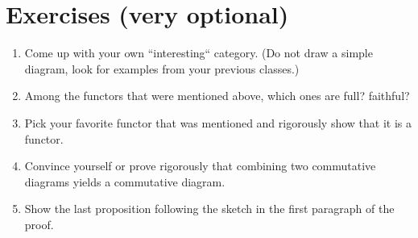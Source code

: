 \documentclass{article}
\theoremstyle{definition}
\theoremstyle{remark}
\begin{document}
\section{Exercises (very optional)}
\begin{enumerate}
	\item Come up with your own ``interesting`` category. (Do not draw a simple diagram, look for examples from your previous classes.)
	\item Among the functors that were mentioned above, which ones are full? faithful?
	\item Pick your favorite functor that was mentioned and rigorously show that it is a functor.
	\item Convince yourself or prove rigorously that combining two commutative diagrams yields a commutative diagram.
	\item Show the last proposition following the sketch in the first paragraph of the proof.
\end{enumerate}
\end{document}
